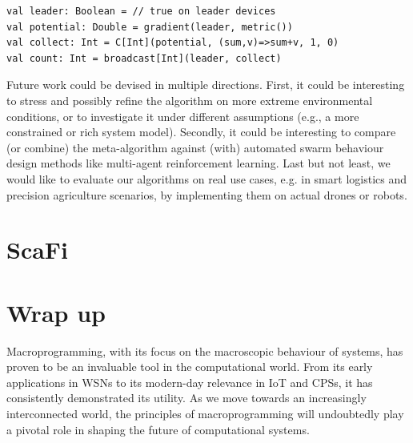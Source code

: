 \begin{lstlisting}
val leader: Boolean = // true on leader devices
val potential: Double = gradient(leader, metric())
val collect: Int = C[Int](potential, (sum,v)=>sum+v, 1, 0)
val count: Int = broadcast[Int](leader, collect)
\end{lstlisting}

Future work could be devised in multiple directions.
%
First, it could be interesting to stress and possibly refine
the algorithm on more extreme environmental conditions,
 or to investigate it under different assumptions (e.g., a more constrained or rich system model).
%
Secondly, it could be interesting to compare (or combine) the meta-algorithm against (with)
 automated swarm behaviour design methods
 like multi-agent reinforcement learning.
%
Last but not least, we would like to evaluate our algorithms on real use cases, e.g. in smart logistics and precision agriculture scenarios, by implementing them %
on actual drones or robots.
\section{ScaFi}

\section{Wrap up}

Macroprogramming, with its focus on the macroscopic behaviour of systems, 
 has proven to be an invaluable tool in the computational world. 
%
From its early applications in WSNs to its modern-day relevance in IoT and CPSs, 
 it has consistently demonstrated its utility. 
As we move towards an increasingly interconnected world, 
 the principles of macroprogramming will undoubtedly play a pivotal role in shaping the future of computational systems.



